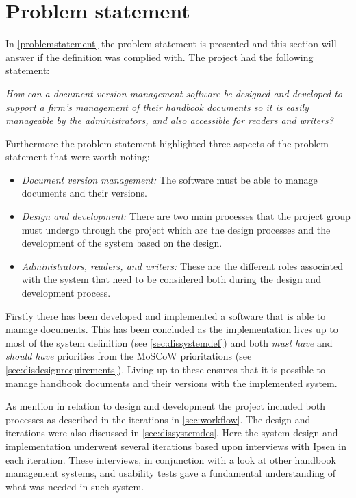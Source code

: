 \section{Problem statement}
In \cref{problemstatement} the problem statement is presented and this section will answer if the definition was complied with.
The project had the following statement:

\begin{center}
\textit{How can a document version management software be designed and developed to support a firm's management of their handbook documents so it is easily manageable by the administrators, and also accessible for readers and writers?}
\end{center}

Furthermore the problem statement highlighted three aspects of the problem statement that were worth noting:

\begin{itemize}
	\item
		\textit{Document version management:}
		The software must be able to manage documents and their versions.
	\item
		\textit{Design and development:}
		There are two main processes that the project group must undergo through the project which are the design processes and the development of the system based on the design.
	\item
		\textit{Administrators, readers, and writers:}
		These are the different roles associated with the system that need to be considered both during the design and development process.

\end{itemize}

Firstly there has been developed and implemented a software that is able to manage documents.
This has been concluded as the implementation lives up to most of the system definition (see \cref{sec:dissystemdef}) and both \textit{must have} and \textit{should have} priorities from the MoSCoW prioritations (see \cref{sec:disdesignrequirements}).
Living up to these ensures that it is possible to manage handbook documents and their versions with the implemented system.

As mention in relation to design and development the project included both processes as described in the iterations in \cref{sec:workflow}.
The design and iterations were also discussed in {\color{red}\cref{sec:dissystemdes}}.
Here the system design and implementation underwent several iterations based upon interviews with Ipsen in each iteration.
These interviews, in conjunction with a look at other handbook management systems, and usability tests gave a fundamental understanding of what was needed in such system.

